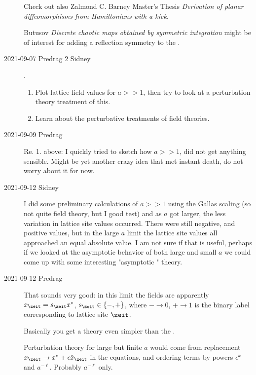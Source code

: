 \begin{description}
Check out also Zalmond C. Barney
{Master's Thesis}
{\em Derivation of planar diffeomorphisms from Hamiltonians with a kick}.

Butusov \etal{}
{\em Discrete chaotic maps obtained by symmetric integration}
might be of interest for adding a reflection symmetry to the {\HenonMap}.

\item[2021-09-07 Predrag 2 Sidney].

\begin{enumerate}
  \item
Plot lattice field values for $a>>1$, then try to look at a perturbation
theory treatment of this.
  \item
Learn about the
perturbative treatments of field theories.
\end{enumerate}

\item[2021-09-09 Predrag]
Re. 1. above:
I quickly tried to sketch how $a>>1$, did not get anything sensible.
Might be yet another crazy idea that met instant death, do not worry
about it for now.

\item[2021-09-12 Sidney]

I did some preliminary calculations of $a>>1$ using the Gallas scaling
(so not quite field theory, but I good test) and as $a$ got larger, the
less variation in lattice site values occurred. There were still
negative, and positive values, but in the large $a$ limit the lattice
site values all approached an equal absolute value. I am not sure if that
is useful, perhaps if we looked at the asymptotic behavior of both large
and small $a$ we could come up with some interesting "asymptotic
\henlatt" theory.

\item[2021-09-12 Predrag]
That sounds very good: in this limit the fields are apparently
$\ssp_\zeit=\Ssym{\zeit}\ssp^*$,
$\Ssym{\zeit}\in\{-,+\}$,
where $-\to0$, $+\to1$ is the binary label corresponding to
lattice site $\zeit$.

Basically you get a theory even simpler than the \templatt.

Perturbation theory for large but finite $a$ would come from replacement
$\ssp_\zeit \to \ssp^*+\epsilon\hat{\ssp}_\zeit$ in the equations,
and ordering terms by powers $\epsilon^k$ and $a^{-\ell}$.
Probably  $a^{-\ell}$ only.


\end{description}
